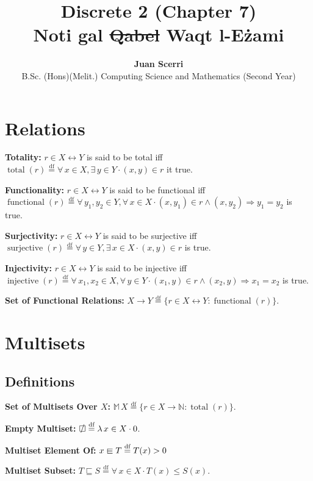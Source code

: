 \documentclass[12pt]{article}
\title{Discrete 2 (Chapter 7)\\
\vspace{0.75em}\textbf{Noti g\mh al \st{Qabel} Waqt l-E\.zami}}
\author {{\textbf{Juan Scerri}}\\
B.Sc. (Hons)(Melit.) Computing Science and Mathematics (Second Year)}
\newcommand{\dfeq}{\stackrel{\text{df}}{=}}
\newcommand{\sqemptyset}{\ensurestackMath{\stackinset{c}{}{c}{}{/}{\square}}}
\newcommand{\sqin}{%
  \mathrel{\vphantom{\sqsubset}\text{%
    \mathsurround=0pt
    \ooalign{$\sqsubset$\cr$-$\cr}%
  }}%
}
\DeclareMathOperator{\jtotal}{total}
\DeclareMathOperator{\jfunctional}{functional}
\DeclareMathOperator{\jinjective}{injective}
\DeclareMathOperator{\jsurjective}{surjective}
\theoremstyle{plain}
\begin{document}
\maketitle %

\thispagestyle{empty} %

\raggedright

\section{Relations}

\textbf{Totality:} $r \in X \leftrightarrow Y$ is said to be
total iff $\jtotal(r) \dfeq \forall\, x \in X, \exists\, y \in
Y \cdot (x, y) \in r$ it true.

\textbf{Functionality:} $r \in X \leftrightarrow Y$ is said to
be functional iff $\jfunctional(r) \dfeq\forall\, y_1, y_2 \in
Y, \forall\, x \in X \cdot (x, y_1) \in r \land (x, y_2)
\Rightarrow y_1 = y_2$ is true.

\textbf{Surjectivity:} $r \in X \leftrightarrow Y$ is said to be
surjective iff $\jsurjective(r) \dfeq\forall\, y \in Y,
\exists\, x \in X \cdot (x, y) \in r$ is true.

\textbf{Injectivity:} $r \in X \leftrightarrow Y$ is said to be
injective iff $\jinjective(r) \dfeq \forall\, x_1, x_2 \in X,
\forall\, y \in Y \cdot (x_1, y) \in r \land (x_2, y)
\Rightarrow x_1 = x_2$ is true.

\textbf{Set of Functional Relations:} $X \rightarrow Y
\dfeq \{r \in X \leftrightarrow Y : \jfunctional(r) \}$.

\section{Multisets}

\subsection{Definitions}

\textbf{Set of Multisets Over $X$:} $\mathbb{M}\,X \dfeq \{r \in
X \rightarrow \mathbb{N} : \jtotal(r)\}$.

\textbf{Empty Multiset:} $\sqemptyset \dfeq \lambda\, x \in X
\cdot 0$.

\textbf{Multiset Element Of:} $x \sqin T \dfeq T(x) > 0$

\textbf{Multiset Subset:} $T \sqsubseteq S \dfeq \forall\, x
\in X \cdot T(x) \leq S(x)$.
\end{document}
